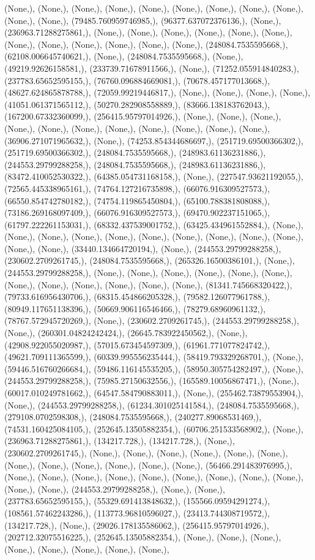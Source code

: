 \documentclass{article}
\begin{document}
(None,), (None,), (None,), (None,), (None,), (None,), (None,), (None,), (None,), (None,), (None,), (79485.760959746985,), (96377.637072376136,), (None,), (236963.71288275861,), (None,), (None,), (None,), (None,), (None,), (None,), (None,), (None,), (None,), (None,), (None,), (None,), (248084.7535595668,), (62108.006645740621,), (None,), (248084.7535595668,), (None,), (49219.92626158581,), (233739.71678911566,), (None,), (71252.055914840283,), (237783.65652595155,), (76760.096884669081,), (70678.457177013668,), (48627.624865878788,), (72059.99219446817,), (None,), (None,), (None,), (None,), (41051.061371565112,), (50270.282908558889,), (83666.138183762043,), (167200.67332360099,), (256415.95797014926,), (None,), (None,), (None,), (None,), (None,), (None,), (None,), (None,), (None,), (None,), (None,), (36906.271071965632,), (None,), (74253.854344686697,), (251719.69500366302,), (251719.69500366302,), (248084.7535595668,), (248983.61136231886,), (244553.29799288258,), (248084.7535595668,), (248983.61136231886,), (83472.410052530322,), (64385.054731168158,), (None,), (227547.93621192055,), (72565.445338965161,), (74764.127216735898,), (66076.916309527573,), (66550.854742780182,), (74754.119865450804,), (65100.788381808088,), (73186.269168097409,), (66076.916309527573,), (69470.902237151065,), (61797.222261153031,), (68332.437539001752,), (63425.434961552884,), (None,), (None,), (None,), (None,), (None,), (None,), (None,), (None,), (None,), (None,), (None,), (None,), (33440.134664720194,), (None,), (244553.29799288258,), (230602.2709261745,), (248084.7535595668,), (265326.16500386101,), (None,), (244553.29799288258,), (None,), (None,), (None,), (None,), (None,), (None,), (None,), (None,), (None,), (None,), (None,), (None,), (81341.745668320422,), (79733.616956430706,), (68315.454866205328,), (79582.126077961788,), (80949.117651138396,), (50669.906116546466,), (78279.68960961132,), (78767.572945720269,), (None,), (230602.2709261745,), (244553.29799288258,), (None,), (260301.04824242424,), (26645.783922450562,), (None,), (42908.922055020987,), (57015.673454597309,), (61961.771077824742,), (49621.709111365599,), (60339.995556235444,), (58419.793329268701,), (None,), (59446.516760266684,), (59486.116145535205,), (58950.305754282497,), (None,), (244553.29799288258,), (75985.27150632556,), (165589.10056867471,), (None,), (60017.010249781662,), (64547.584790883011,), (None,), (255462.73879553904,), (None,), (244553.29799288258,), (61234.301025141584,), (248084.7535595668,), (279108.0702598308,), (248084.7535595668,), (240277.89068531469,), (74531.160425084105,), (252645.13505882354,), (60706.251533568902,), (None,), (236963.71288275861,), (134217.728,), (134217.728,), (None,), (230602.2709261745,), (None,), (None,), (None,), (None,), (None,), (None,), (None,), (None,), (None,), (None,), (None,), (None,), (56466.291483976995,), (None,), (None,), (None,), (None,), (None,), (None,), (None,), (None,), (None,), (None,), (None,), (244553.29799288258,), (None,), (None,), (237783.65652595155,), (55329.691413848632,), (155566.09594291274,), (108561.57462243286,), (113773.96810596027,), (23413.744308719572,), (134217.728,), (None,), (29026.178135586062,), (256415.95797014926,), (202712.32075516225,), (252645.13505882354,), (None,), (None,), (None,), (None,), (None,), (None,), (None,), (None,), 
\end{document}
